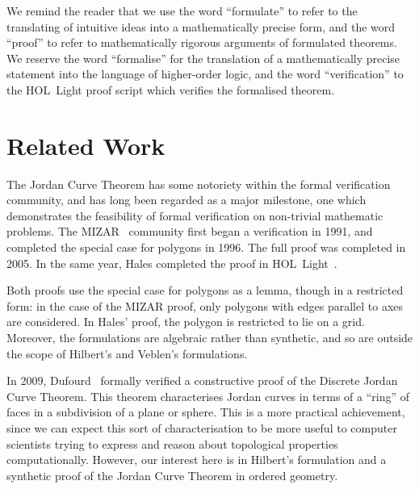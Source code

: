 We remind the reader that we use the word ``formulate'' to refer to the translating of intuitive ideas into a mathematically precise form, and the word ``proof'' to refer to mathematically rigorous arguments of formulated theorems. We reserve the word ``formalise'' for the translation of a mathematically precise statement into the language of higher-order logic, and the word ``verification'' to the HOL~Light proof script which verifies the formalised theorem.

\section{Related Work}
The Jordan Curve Theorem has some notoriety within the formal verification community, and has long been regarded as a major milestone, one which  demonstrates the feasibility of formal verification on non-trivial mathematic problems. The MIZAR~\cite{MizarMathematicalVernacular} community first began a verification in 1991, and completed the special case for polygons in 1996. The full proof was completed in 2005. In the same year, Hales completed the proof in HOL~Light~\cite{HalesJordanCurve}. 

Both proofs use the special case for polygons as a lemma, though in a restricted form: in the case of the MIZAR proof, only polygons with edges parallel to axes are considered. In Hales' proof, the polygon is restricted to lie on a grid. Moreover, the formulations are algebraic rather than synthetic, and so are outside the scope of Hilbert's and Veblen's formulations.

In 2009, Dufourd~\cite{DufourdJordanCurve} formally verified a constructive proof of the Discrete Jordan Curve Theorem. This theorem characterises Jordan curves in terms of a ``ring'' of faces in a subdivision of a plane or sphere. This is a more practical achievement, since we can expect this sort of characterisation to be more useful to computer scientists trying to express and reason about topological properties computationally. However, our interest here is in Hilbert's formulation and a synthetic proof of the Jordan Curve Theorem in ordered geometry.



